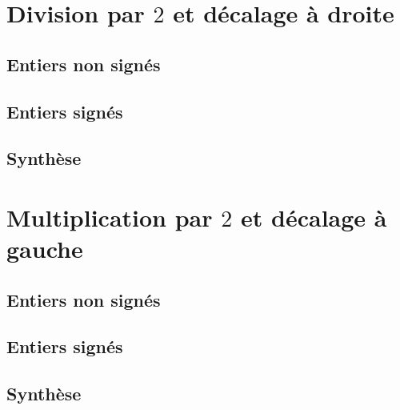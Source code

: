 \documentclass[12pt]{amsart}
\begin{document}





\section{Division par $2$ et décalage à droite}

\subsection{Entiers non signés}




\subsection{Entiers signés}




\subsection{Synthèse}






\section{Multiplication par $2$ et décalage à gauche}

\subsection{Entiers non signés}




\subsection{Entiers signés}



\subsection{Synthèse}

\end{document}
